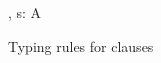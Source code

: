 \begin{figure}[H]
\flushleft {}
\begin{smathpar}
{
   \Gamma \vdash {} \dashv \Delta,  s: A
}
\end{smathpar}
\caption{Typing rules for clauses}
\end{figure}

